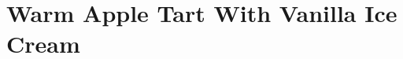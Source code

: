\thispagestyle{fancy}
\section{Warm Apple Tart With Vanilla Ice Cream}
\AddToShipoutPicture*{\AppleTart}
